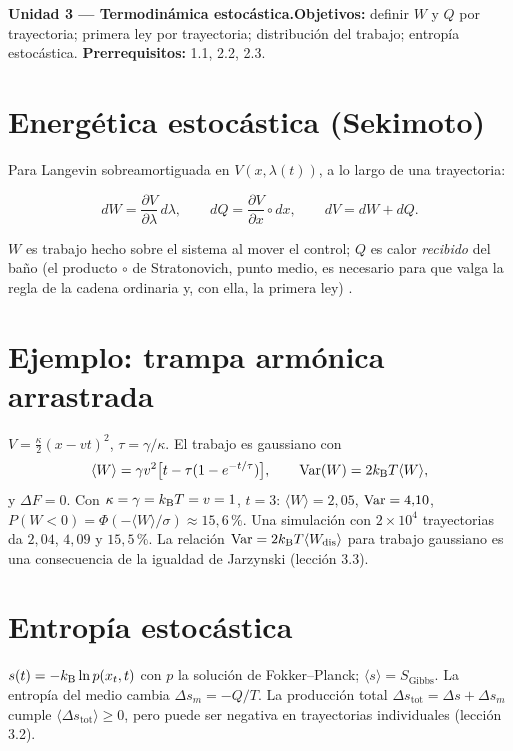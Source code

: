 \documentclass[11pt,a4paper]{article}
\begin{document}

\noindent\textbf{Unidad 3 --- Termodinámica estocástica.}\quad\textbf{Objetivos:} definir $W$ y $Q$ por trayectoria; primera ley
por trayectoria; distribución del trabajo; entropía estocástica. \textbf{Prerrequisitos:} 1.1, 2.2, 2.3.

\section{Energética estocástica (Sekimoto)}
Para Langevin sobreamortiguada en $V(x,\lambda(t))$, a lo largo de una trayectoria:
\begin{resultado}
\begin{equation}dW=\frac{\partial V}{\partial\lambda}\,d\lambda,\qquad dQ=\frac{\partial V}{\partial x}\circ dx,\qquad dV=dW+dQ .\end{equation}
\end{resultado}
$W$ es trabajo hecho sobre el sistema al mover el control; $Q$ es calor \emph{recibido} del baño (el producto $\circ$ de Stratonovich, punto
medio, es necesario para que valga la regla de la cadena ordinaria y, con ella, la primera ley) \cite{seifert,peliti}.

\section{Ejemplo: trampa armónica arrastrada}
$V=\frac\kappa2(x-vt)^2$, $\tau=\gamma/\kappa$. El trabajo es gaussiano con
\[\langle W\rangle=\gamma v^2\big[t-\tau(1-e^{-t/\tau})\big],\qquad\operatorname{Var}(W)=2k_{\mathrm B} T\langle W\rangle,\]
y $\Delta F=0$. Con $\kappa=\gamma=k_{\mathrm B} T=v=1$, $t=3$: $\langle W\rangle=2{,}05$, $\operatorname{Var}=4{,}10$, $P(W<0)=\Phi(-\langle W\rangle/\sigma)\approx15{,}6\,\%$.
Una simulación con $2\times10^4$ trayectorias \evS{} da $2{,}04$, $4{,}09$ y $15{,}5\,\%$. La relación $\operatorname{Var}=2k_{\mathrm B} T\langle W_{\text{dis}}\rangle$ para
trabajo gaussiano es una consecuencia de la igualdad de Jarzynski (lección 3.3).

\section{Entropía estocástica}
$s(t)=-k_{\mathrm B}\ln p(x_t,t)$ con $p$ la solución de Fokker--Planck; $\langle s\rangle=S_{\text{Gibbs}}$. La entropía del medio cambia
$\Delta s_m=-Q/T$. La producción total $\Delta s_{\text{tot}}=\Delta s+\Delta s_m$ cumple $\langle\Delta s_{\text{tot}}\rangle\ge0$, pero
puede ser negativa en trayectorias individuales (lección 3.2).
\end{document}
